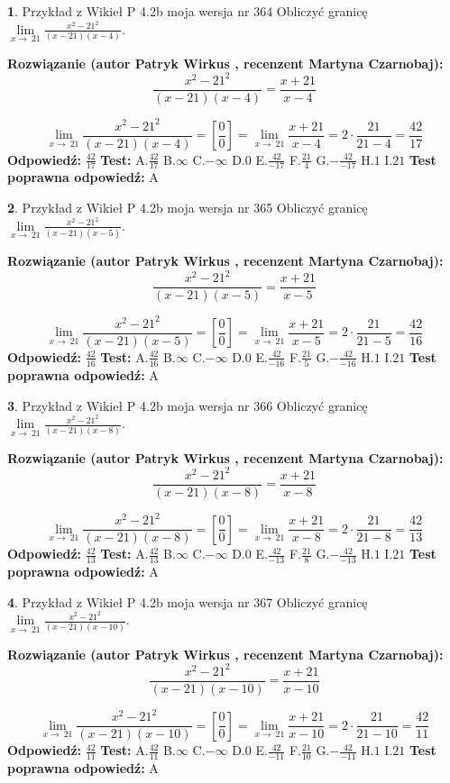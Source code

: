 \documentclass[12pt, a4paper]{article}
\theoremstyle{definition} %
\newtheorem{zad}{}
\newcommand{\zadStart}[1]{\begin{zad}#1\newline}
\newcommand{\zadStop}{\end{zad}}
\newcommand{\rozwStart}[2]{\noindent \textbf{Rozwiązanie (autor #1 , recenzent #2): }\newline}
\newcommand{\rozwStop}{\newline}
\newcommand{\odpStart}{\noindent \textbf{Odpowiedź:}\newline}
\newcommand{\odpStop}{\newline}
\newcommand{\testStart}{\noindent \textbf{Test:}\newline}
\newcommand{\testStop}{\newline}
\newcommand{\kluczStart}{\noindent \textbf{Test poprawna odpowiedź:}\newline}
\newcommand{\kluczStop}{\newline}
\begin{document}
\zadStart{Przykład z Wikieł P 4.2b moja wersja nr 364}
Obliczyć granicę $\lim\limits_{x\to\ 21}\frac{x^{2}-21^{2}}{(x-21)(x-4)}$.
\zadStop
\rozwStart{Patryk Wirkus}{Martyna Czarnobaj}
$$\frac{x^{2}-21^{2}}{(x-21)(x-4)}=\frac{x+21}{x-4}$$

$$\lim\limits_{x\to\ 21}\frac{x^{2}-21^{2}}{(x-21)(x-4)}=[\frac{0}{0}]=\lim\limits_{x\to\ 21}\frac{x+21}{x-4}=2 \cdot \frac{21}{21-4} = \frac{42}{17}$$
\rozwStop
\odpStart
$\frac{42}{17}$
\odpStop
\testStart
A.$\frac{42}{17}$
B.$\infty$
C.$-\infty$
D.$0$
E.$\frac{42}{-17}$
F.$\frac{21}{4}$
G.$-\frac{42}{-17}$
H.$1$
I.$21$
\testStop
\kluczStart
A
\kluczStop



\zadStart{Przykład z Wikieł P 4.2b moja wersja nr 365}
Obliczyć granicę $\lim\limits_{x\to\ 21}\frac{x^{2}-21^{2}}{(x-21)(x-5)}$.
\zadStop
\rozwStart{Patryk Wirkus}{Martyna Czarnobaj}
$$\frac{x^{2}-21^{2}}{(x-21)(x-5)}=\frac{x+21}{x-5}$$

$$\lim\limits_{x\to\ 21}\frac{x^{2}-21^{2}}{(x-21)(x-5)}=[\frac{0}{0}]=\lim\limits_{x\to\ 21}\frac{x+21}{x-5}=2 \cdot \frac{21}{21-5} = \frac{42}{16}$$
\rozwStop
\odpStart
$\frac{42}{16}$
\odpStop
\testStart
A.$\frac{42}{16}$
B.$\infty$
C.$-\infty$
D.$0$
E.$\frac{42}{-16}$
F.$\frac{21}{5}$
G.$-\frac{42}{-16}$
H.$1$
I.$21$
\testStop
\kluczStart
A
\kluczStop



\zadStart{Przykład z Wikieł P 4.2b moja wersja nr 366}
Obliczyć granicę $\lim\limits_{x\to\ 21}\frac{x^{2}-21^{2}}{(x-21)(x-8)}$.
\zadStop
\rozwStart{Patryk Wirkus}{Martyna Czarnobaj}
$$\frac{x^{2}-21^{2}}{(x-21)(x-8)}=\frac{x+21}{x-8}$$

$$\lim\limits_{x\to\ 21}\frac{x^{2}-21^{2}}{(x-21)(x-8)}=[\frac{0}{0}]=\lim\limits_{x\to\ 21}\frac{x+21}{x-8}=2 \cdot \frac{21}{21-8} = \frac{42}{13}$$
\rozwStop
\odpStart
$\frac{42}{13}$
\odpStop
\testStart
A.$\frac{42}{13}$
B.$\infty$
C.$-\infty$
D.$0$
E.$\frac{42}{-13}$
F.$\frac{21}{8}$
G.$-\frac{42}{-13}$
H.$1$
I.$21$
\testStop
\kluczStart
A
\kluczStop



\zadStart{Przykład z Wikieł P 4.2b moja wersja nr 367}
Obliczyć granicę $\lim\limits_{x\to\ 21}\frac{x^{2}-21^{2}}{(x-21)(x-10)}$.
\zadStop
\rozwStart{Patryk Wirkus}{Martyna Czarnobaj}
$$\frac{x^{2}-21^{2}}{(x-21)(x-10)}=\frac{x+21}{x-10}$$

$$\lim\limits_{x\to\ 21}\frac{x^{2}-21^{2}}{(x-21)(x-10)}=[\frac{0}{0}]=\lim\limits_{x\to\ 21}\frac{x+21}{x-10}=2 \cdot \frac{21}{21-10} = \frac{42}{11}$$
\rozwStop
\odpStart
$\frac{42}{11}$
\odpStop
\testStart
A.$\frac{42}{11}$
B.$\infty$
C.$-\infty$
D.$0$
E.$\frac{42}{-11}$
F.$\frac{21}{10}$
G.$-\frac{42}{-11}$
H.$1$
I.$21$
\testStop
\kluczStart
A
\kluczStop
\end{document}
